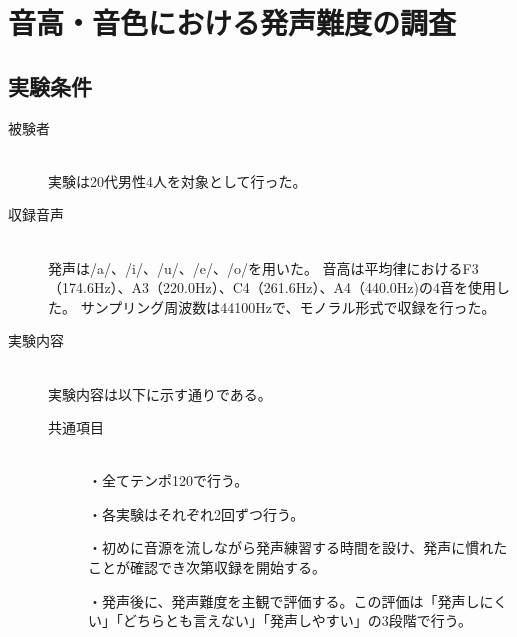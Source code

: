 \documentclass[10.5ptj,a4j,dvipdfmx,uplatex, oneside, openany]{jsbook}%
\begin{document}


\chapter{音高・音色における発声難度の調査}




\section{実験条件}
\begin{description}
    \item[被験者]\mbox{}\\
        実験は20代男性4人を対象として行った。
    \item[収録音声]\mbox{}\\
        発声は/a/、/i/、/u/、/e/、/o/を用いた。
        音高は平均律におけるF3（174.6Hz）、A3（220.0Hz）、C4（261.6Hz）、A4（440.0Hz)の4音を使用した。
        サンプリング周波数は44100Hzで、モノラル形式で収録を行った。
    \item[実験内容]\mbox{}\\
        実験内容は以下に示す通りである。
        \begin{description}
            \item[共通項目]\mbox{}\\
                ・全てテンポ120で行う。
                
                ・各実験はそれぞれ2回ずつ行う。
                
                ・初めに音源を流しながら発声練習する時間を設け、発声に慣れたことが確認でき次第収録を開始する。

                ・発声後に、発声難度を主観で評価する。この評価は「発声しにくい」「どちらとも言えない」「発声しやすい」の3段階で行う。
                

\end{description}
\end{description}
\end{document}
